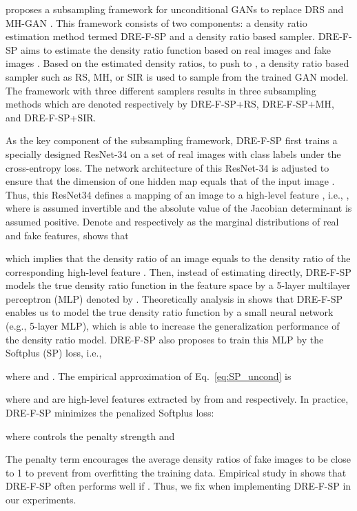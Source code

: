 \documentclass[10pt, twocolumn]{article}
\theoremstyle{definition}
\begin{document}
\cite{ding2020subsampling} proposes a subsampling framework for unconditional GANs to replace DRS \cite{azadi2018discriminator} and MH-GAN \cite{turner2018metropolis}. This framework consists of two components: a density ratio estimation method termed DRE-F-SP and a density ratio based sampler. DRE-F-SP aims to estimate the density ratio function  based on  real images  and  fake images . Based on the estimated density ratios, to push  to , a density ratio based sampler such as RS, MH, or SIR is used to sample from the trained GAN model. The framework with three different samplers results in three subsampling methods which are denoted respectively by DRE-F-SP+RS, DRE-F-SP+MH, and DRE-F-SP+SIR.

As the key component of the subsampling framework, DRE-F-SP \cite{ding2020subsampling} first trains a specially designed ResNet-34 \cite{he2016deep} on a set of real images with class labels under the cross-entropy loss. The network architecture of this ResNet-34 is adjusted to ensure that the dimension of one hidden map  equals that of the input image . Thus, this ResNet34 defines a mapping of an image  to a high-level feature , i.e., , 
where  is assumed invertible and the absolute value of the Jacobian determinant  is assumed positive. Denote  and  respectively as the marginal distributions of real and fake features, \cite{ding2020subsampling} shows that 

which implies that the density ratio of an image  equals to the density ratio of the corresponding high-level feature . Then, instead of estimating  directly, DRE-F-SP models the true density ratio function  in the feature space by a 5-layer multilayer perceptron (MLP) denoted by . Theoretically analysis in \cite{ding2020subsampling} shows that DRE-F-SP enables us to model the true density ratio function by a small neural network (e.g., 5-layer MLP), which is able to increase the generalization performance of the density ratio model. DRE-F-SP also proposes to train this MLP by the Softplus (SP) loss, i.e.,

where  and . The empirical approximation of Eq.\ \eqref{eq:SP_uncond} is 

where  and  are high-level features extracted by  from  and  respectively. In practice, DRE-F-SP minimizes the penalized Softplus loss:

where  controls the penalty strength and

The penalty term  encourages the average density ratios of fake images to be close to 1 to prevent  from overfitting the training data. Empirical study in \cite{ding2020subsampling} shows that DRE-F-SP often performs well if . Thus, we fix  when implementing DRE-F-SP in our experiments.
\end{document}

